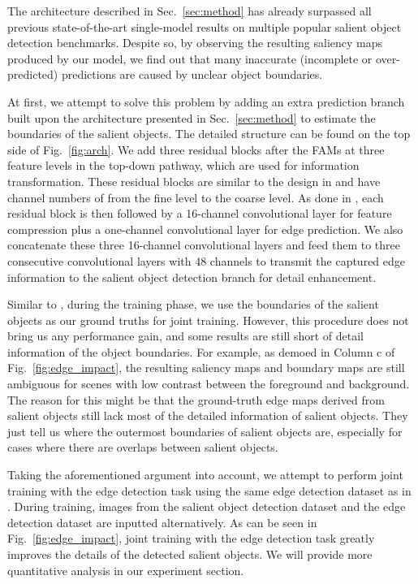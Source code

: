 \documentclass[10pt,twocolumn,letterpaper]{article}
\newcommand{\figref}[1]{Fig.~\ref{#1}}
\newcommand{\secref}[1]{Sec.~\ref{#1}}
\begin{document}
The architecture described in \secref{sec:method} has already surpassed all previous
state-of-the-art single-model results on multiple popular salient object detection benchmarks. 
Despite so, by observing the resulting saliency maps produced by our model,
we find out that many inaccurate (incomplete or over-predicted) predictions are caused
by unclear object boundaries.

At first, we attempt to solve this problem by adding an extra prediction branch
built upon the architecture presented in \secref{sec:method} to estimate the boundaries
of the salient objects.
The detailed structure can be found on the top side of \figref{fig:arch}.
We add three residual blocks \cite{He2016} after the FAMs at three feature levels
in the top-down pathway, which are used for information transformation.
These residual blocks are similar to the design 
in \cite{He2016} and have channel numbers of 
 from the fine level to the coarse level.
As done in \cite{liu2016richer}, each residual block is 
then followed by a 16-channel  convolutional layer 
for feature compression plus a one-channel 
convolutional layer for edge prediction.
We also concatenate these three 16-channel 
convolutional layers and feed them to three consecutive 
 convolutional layers with 48 channels to 
transmit the captured edge information to the salient 
object detection branch for detail enhancement. 

Similar to \cite{li2017instance}, during the training phase, 
we use the boundaries of the salient objects as our 
ground truths for joint training. 
However, this procedure does not bring us any performance gain, 
and some results are still short of detail information of 
the object boundaries.
For example, as demoed in Column c of \figref{fig:edge_impact}, 
the resulting saliency maps and boundary maps are still 
ambiguous for scenes with low contrast between the foreground and background.
The reason for this might be that the ground-truth edge maps
derived from salient objects still lack most of the detailed
information of salient objects.
They just tell us where the outermost boundaries of salient
objects are, especially for cases where there are overlaps 
between salient objects.



Taking the aforementioned argument into account, we attempt to 
perform joint training with the edge detection task 
using the same edge detection dataset
\cite{arbelaez2011contour,mottaghi2014role} 
as in \cite{liu2016richer}.
During training, images from the salient object detection 
dataset and the edge detection dataset are inputted alternatively.
As can be seen in \figref{fig:edge_impact}, joint training with 
the edge detection task greatly improves the details of 
the detected salient objects.
We will provide more quantitative analysis 
in our experiment section.
\end{document}
